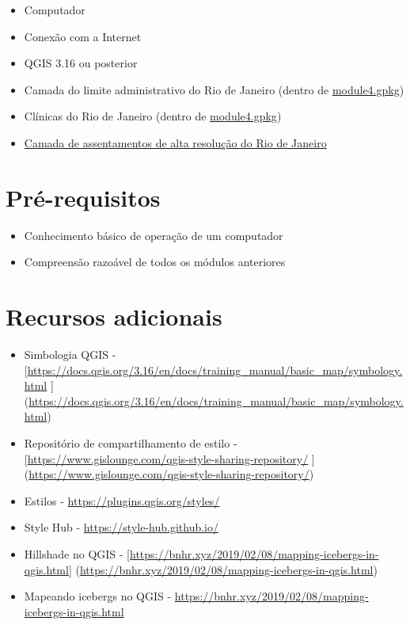 \documentclass[
]{book}
\providecommand{\tightlist}{%
  \setlength{\itemsep}{0pt}\setlength{\parskip}{0pt}}
\begin{document}
\begin{itemize}
\tightlist
\item
  Computador
\item
  Conexão com a Internet
\item
  QGIS 3.16 ou posterior
\item
  Camada do limite administrativo do Rio de Janeiro (dentro de \href{data/module4.gpkg}{module4.gpkg})
\item
  Clínicas do Rio de Janeiro (dentro de \href{data/module4.gpkg}{module4.gpkg})
\item
  \href{data/hrsl_rj_capital_populacao.tif}{Camada de assentamentos de alta resolução do Rio de Janeiro}
\end{itemize}

\hypertarget{pruxe9-requisitos-4}{%
\section{Pré-requisitos}\label{pruxe9-requisitos-4}}

\begin{itemize}
\tightlist
\item
  Conhecimento básico de operação de um computador
\item
  Compreensão razoável de todos os módulos anteriores
\end{itemize}

\hypertarget{recursos-adicionais-4}{%
\section{Recursos adicionais}\label{recursos-adicionais-4}}

\begin{itemize}
\tightlist
\item
  Simbologia QGIS - {[}\url{https://docs.qgis.org/3.16/en/docs/training_manual/basic_map/symbology.html} {]} (\url{https://docs.qgis.org/3.16/en/docs/training_manual/basic_map/symbology.html})
\item
  Repositório de compartilhamento de estilo - {[}\url{https://www.gislounge.com/qgis-style-sharing-repository/} {]} (\url{https://www.gislounge.com/qgis-style-sharing-repository/})
\item
  Estilos - \href{https://plugins.qg\%20is.org/styles/}{https://plugins.qgis.org/styles/}
\item
  Style Hub - \url{https://style-hub.github.io/}
\item
  Hillshade no QGIS - {[}\url{https://bnhr.xyz/2019/02/08/mapping-icebergs-in-qgis.html}{]} (\url{https://bnhr.xyz/2019/02/08/mapping-icebergs-in-qgis.html})
\item
  Mapeando icebergs no QGIS - \url{https://bnhr.xyz/2019/02/08/mapping-icebergs-in-qgis.html}
\end{itemize}
\end{document}
